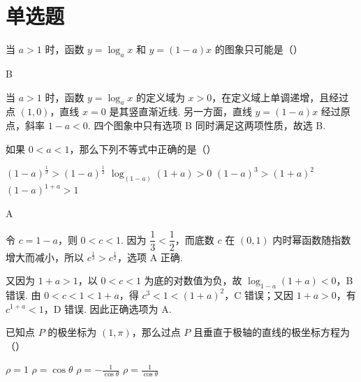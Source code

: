 \section{单选题}

\begin{problem}
当 \(a > 1\) 时，函数 \(y = \log_a x\) 和 \(y = (1 - a)x\) 的图象只可能是（\quad）

    {}
    {}
    {}
\end{problem}

\begin{answer}
B
\end{answer}

\begin{solution}
当 \(a>1\) 时，函数 \(y=\log_a x\) 的定义域为 \(x>0\)，在定义域上单调递增，且经过点 \((1,0)\)，直线 \(x=0\) 是其竖直渐近线. 另一方面，直线 \(y=(1-a)x\) 经过原点，斜率 \(1-a<0\). 四个图象中只有选项 B 同时满足这两项性质，故选 B.
\end{solution}

\begin{problem}
如果 \(0 < a < 1\)，那么下列不等式中正确的是（\quad）

\choices
    {\((1 - a)^{\frac{1}{3}} > (1 - a)^{\frac{1}{2}}\)}
    {\(\log_{(1 - a)}(1 + a) > 0\)}
    {\((1 - a)^3 > (1 + a)^2\)}
    {\((1 - a)^{1 + a} > 1\)}
\end{problem}

\begin{answer}
A
\end{answer}

\begin{solution}
令 \(c=1-a\)，则 \(0<c<1\). 因为 \(\dfrac{1}{3}<\dfrac{1}{2}\)，而底数 \(c\) 在 \((0,1)\) 内时幂函数随指数增大而减小，所以 \(c^{\frac{1}{3}}>c^{\frac{1}{2}}\)，选项 A 正确.

又因为 \(1+a>1\)，以 \(0<c<1\) 为底的对数值为负，故 \(\log_{1-a}(1+a)<0\)，B 错误. 由 \(0<c<1<1+a\)，得 \(c^3<1<(1+a)^2\)，C 错误；又因 \(1+a>0\)，有 \(c^{1+a}<1\)，D 错误. 因此正确选项为 A.
\end{solution}

\begin{problem}
已知点 \(P\) 的极坐标为 \((1,\pi)\)，那么过点 \(P\) 且垂直于极轴的直线的极坐标方程为（\quad）

\choices
    {\(\rho = 1\)}
    {\(\rho = \cos \theta\)}
    {\(\rho = -\frac{1}{\cos \theta}\)}
    {\(\rho = \frac{1}{\cos \theta}\)}
\end{problem}

